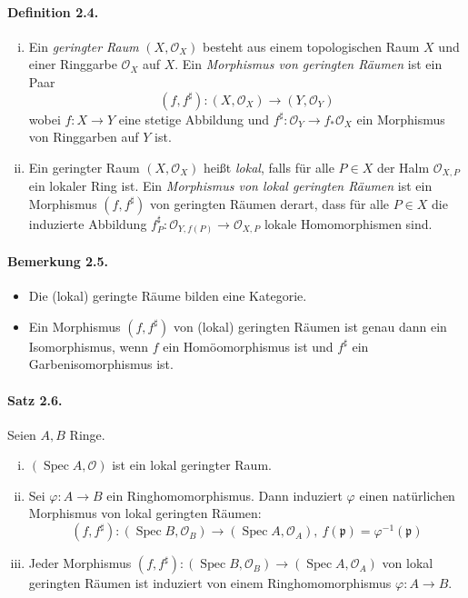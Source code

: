 \paragraph{Definition 2.4.}\label{2.4} \begin{enumerate}[(i)]
\item Ein \textit{geringter Raum} $(X,\mathcal{O}_X)$ besteht aus einem topologischen Raum $X$ und einer Ringgarbe $\mathcal{O}_X$ auf $X$. Ein \textit{Morphismus von geringten Räumen} ist ein Paar
\[(f,f^\sharp):(X,\mathcal{O}_X)\to (Y,\mathcal{O}_Y) \]
wobei $f:X\to Y$ eine stetige Abbildung und $f^\sharp:\mathcal{O}_Y\to f_\ast\mathcal{O}_X$ ein Morphismus von Ringgarben auf $Y$ ist.
\item Ein geringter Raum $(X,\mathcal{O}_X)$ heißt \textit{lokal}, falls für alle $P\in X$ der Halm $\mathcal{O}_{X,P}$ ein lokaler Ring ist. Ein \textit{Morphismus von lokal geringten Räumen} ist ein Morphismus $(f,f^\sharp)$ von geringten Räumen derart, dass für alle $P\in X$ die induzierte Abbildung $f_P^\sharp:\mathcal{O}_{Y,f(P)}\to\mathcal{O}_{X,P}$ lokale Homomorphismen sind.
\end{enumerate}

\paragraph{Bemerkung 2.5.}\label{2.5}\begin{itemize}
\item Die (lokal) geringte Räume bilden eine Kategorie.
\item Ein Morphismus $(f,f^\sharp)$ von (lokal) geringten Räumen ist genau dann ein Isomorphismus, wenn $f$ ein Homöomorphismus ist und $f^\sharp$ ein Garbenisomorphismus ist.
\end{itemize}

\paragraph{Satz 2.6.}\label{2.6} Seien $A,B$ Ringe.
\begin{enumerate}[(i)]
\item $(\operatorname{Spec}A,\mathcal{O})$ ist ein lokal geringter Raum.
\item Sei $\varphi:A\to B$ ein Ringhomomorphismus. Dann induziert $\varphi$ einen natürlichen Morphismus von lokal geringten Räumen:
\[(f,f^\sharp):(\operatorname{Spec}B,\mathcal{O}_B)\to (\operatorname{Spec}A,\mathcal{O}_A),\ f(\mathfrak{p})=\varphi^{-1}(\mathfrak{p}) \]
\item Jeder Morphismus $(f,f^\sharp):(\operatorname{Spec}B,\mathcal{O}_B)\to(\operatorname{Spec}A,\mathcal{O}_A)$ von lokal geringten Räu\-men ist induziert von einem Ringhomomorphismus $\varphi:A\to B$.
\end{enumerate}

